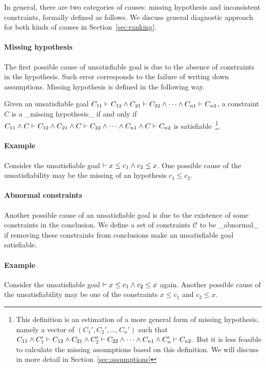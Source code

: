 In general, there are two categories of causes: missing hypothesis and
inconsistent constraints, formally defined as follows. We discuss
general diagnostic approach for both kinds of causes in
Section~\ref{sec:ranking}.

\paragraph{Missing hypothesis}

The first possible cause of unsatisfiable goal is due to the absence
of constraints in the hypothesis. Such error corresponds to the
failure of writing down assumptions. Missing hypothesis is defined in
the following way.

Given an unsatisfiable goal $C_{11} \vdash C_{12} \land C_{21} \vdash C_{22}
\land \dots \land C_{n1} \vdash C_{n2}$, a constraint $C$ is a _missing
hypothesis_ if and only if $C_{11} \land C \vdash C_{12} \land C_{21} \land C
\vdash C_{22} \land \dots \land C_{n1} \land C \vdash C_{n2}$ is
satisfiable~\footnote{This definition is an estimation of a more general form
of missing hypothesis, namely a vector of $(C_1', C_2', \dots, C_n')$ such that
$C_{11} \land C_1' \vdash C_{12} \land C_{21} \land C_2' \vdash C_{22} \land
\dots \land C_{n1} \land C_n' \vdash C_{n2}$. But it is less feasible to
calculate the missing assumptions based on this definition. We will discuss in
more detail in Section~\ref{sec:assumptions}}.

\paragraph{Example}
Consider the unsatisfiable goal $\vdash x \leq c_1 \land c_2 \leq x$.
One possible cause of the unsatisfiability may be the missing of an
hypothesis $c_1\leq c_2$.

\paragraph{Abnormal constraints}

Another possible cause of an unsatisfiable goal is due to the
existence of some constraints in the conclusion. We define a set of
constraints $\mathcal{C}$ to be _abnormal_ if removing these
constraints from conclusions make an unsatisfiable goal satisfiable.

\paragraph{Example}
Consider the unsatisfiable goal $\vdash x \leq c_1 \land c_2 \leq x$
again. Another possible cause of the unsatisfiability may be one of
the constraints $x \leq c_1$ and $c_2 \leq x$. 

